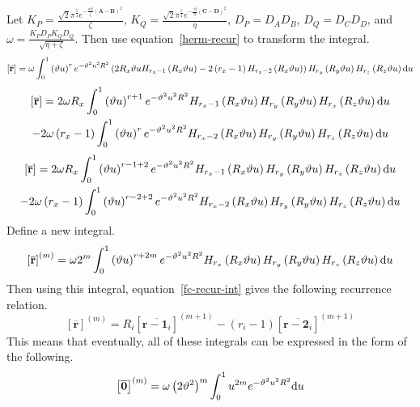 Let $K_P = \frac{\sqrt{2} \pi^{\frac{5}{4}} e^{-\frac{\alpha\beta}{\zeta}\left(\mathbf{A} - \mathbf{B}\right)^2}}{\zeta}$, $K_Q = \frac{\sqrt{2} \pi^{\frac{5}{4}} e^{-\frac{\gamma\delta}{\eta}\left(\mathbf{C} - \mathbf{D}\right)^2}}{\eta}$, $D_P = D_A D_B$, $D_Q = D_C D_D$, and $\omega = \frac{K_PD_P K_Q D_Q}{\sqrt{\eta + \zeta}}$. Then use equation~\ref{herm-recur} to transform the integral.
\begin{equation}
  \left[\overline{\mathbf{r}}\right] = \omega \int_0^1 \left(\vartheta u\right)^r e^{-\vartheta^2 u^2 R^2} \left(2R_x\vartheta u H_{r_x - 1}\left(R_x\vartheta u\right) - 2\left(r_x - 1\right) H_{r_x - 2}\left(R_x \vartheta u\right)\right) H_{r_y}\left(R_y \vartheta u\right) H_{r_z}\left(R_z \vartheta u\right) \mathrm{d} u
\end{equation}
\begin{multline}
  \left[\overline{\mathbf{r}}\right] = 2\omega R_x \int_0^1 \left(\vartheta u\right)^{r + 1} e^{-\vartheta^2 u^2 R^2} H_{r_x - 1}\left(R_x \vartheta u\right) H_{r_y}\left(R_y \vartheta u\right) H_{r_z}\left(R_z \vartheta u\right) \mathrm{d} u \\
  - 2\omega \left(r_x - 1\right) \int_0^1 \left(\vartheta u\right)^{r} e^{-\vartheta^2 u^2 R^2} H_{r_x - 2}\left(R_x \vartheta u\right) H_{r_y}\left(R_y \vartheta u\right) H_{r_z}\left(R_z \vartheta u\right) \mathrm{d} u
\end{multline}
\begin{multline}
  \left[\overline{\mathbf{r}}\right] = 2\omega R_x \int_0^1 \left(\vartheta u\right)^{r - 1 + 2} e^{-\vartheta^2 u^2 R^2} H_{r_x - 1}\left(R_x \vartheta u\right) H_{r_y}\left(R_y \vartheta u\right) H_{r_z}\left(R_z \vartheta u\right) \mathrm{d} u \\
  - 2\omega \left(r_x - 1\right) \int_0^1 \left(\vartheta u\right)^{r - 2 + 2} e^{-\vartheta^2 u^2 R^2} H_{r_x - 2}\left(R_x \vartheta u\right) H_{r_y}\left(R_y \vartheta u\right) H_{r_z}\left(R_z \vartheta u\right) \mathrm{d} u
  \label{fc-recur-int}
\end{multline}
Define a new integral.
\begin{equation}
  \left[\overline{\mathbf{r}}\right]^{(m)} = \omega 2^m \int_0^1 \left(\vartheta u\right)^{r + 2m} e^{-\vartheta^2 u^2 R^2} H_{r_x}\left(R_x \vartheta u\right) H_{r_y}\left(R_y \vartheta u\right) H_{r_z}\left(R_z \vartheta u\right) \mathrm{d} u
\end{equation}
Then using this integral, equation~\ref{fc-recur-int} gives the following recurrence relation.
\begin{equation}
  \left[\overline{\mathbf{r}}\right]^{(m)} = R_i\left[\overline{\mathbf{r} - \mathbf{1}_i}\right]^{(m + 1)} - \left(r_i - 1\right)\left[\overline{\mathbf{r} - \mathbf{2}_i}\right]^{(m + 1)}
  \label{fc-recur-not-int}
\end{equation}
This means that eventually, all of these integrals can be expressed in the form of the following.
\begin{equation}
  \left[\overline{\mathbf{0}}\right]^{(m)} = \omega \left(2\vartheta^2\right)^{m} \int_0^1 u^{2m} e^{-\vartheta^2 u^2 R^2} \mathrm{d} u
\end{equation}

